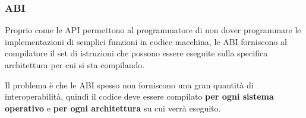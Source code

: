 \subsubsection{ABI}
Proprio come le API permettono al programmatore di non dover programmare le implementazioni di semplici funzioni in codice macchina, le ABI forniscono al compilatore il set di istruzioni che possono essere eseguite sulla specifica architettura per cui si sta compilando.

\spacer
Il problema è che le ABI spesso non forniscono una gran quantità di interoperabilità, quindi il codice deve essere compilato \textbf{per ogni sistema operativo} e \textbf{per ogni architettura} su cui verrà eseguito.
